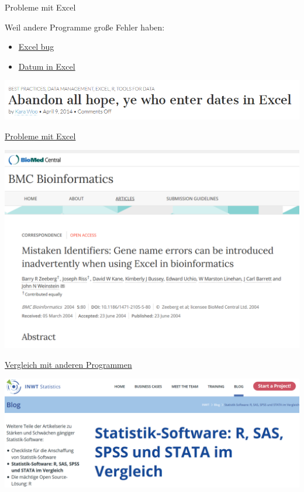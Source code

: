 \documentclass[
  ignorenonframetext,
]{beamer}
\begin{document}
\begin{frame}{Probleme mit Excel}
\protect\hypertarget{probleme-mit-excel}{}

Weil andere Programme große Fehler haben:

\begin{itemize}
\item
  \href{http://blog.revolutionanalytics.com/2013/02/did-an-excel-error-bring-down-the-london-whale.html}{Excel
  bug}
\item
  \href{https://coffeehouse.dataone.org/2014/04/09/abandon-all-hope-ye-who-enter-dates-in-excel/}{Datum
  in Excel}
\end{itemize}

\includegraphics{figure/Abandon.PNG}

\end{frame}

\begin{frame}{\href{http://www.biomedcentral.com/1471-2105/5/80}{Probleme
mit Excel}}
\protect\hypertarget{probleme-mit-excel-1}{}

\includegraphics{figure/ExcelProblems.PNG}

\end{frame}

\begin{frame}{\href{https://www.inwt-statistics.de/blog-artikel-lesen/Statistik-Software-R_SAS_SPSS_STATA_im_Vergleich.html}{Vergleich
mit anderen Programmen}}
\protect\hypertarget{vergleich-mit-anderen-programmen}{}

\includegraphics{figure/SoftwareVergleich.PNG}

\end{frame}
\end{document}
